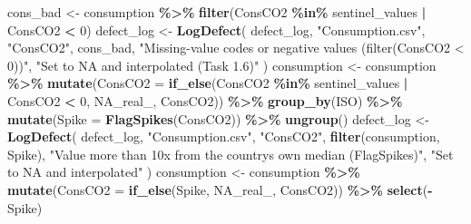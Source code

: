 \documentclass[
]{article}
\newenvironment{Shaded}{\begin{snugshade}}{\end{snugshade}}
\newcommand{\AttributeTok}[1]{\textcolor[rgb]{0.13,0.29,0.53}{#1}}
\newcommand{\ConstantTok}[1]{\textcolor[rgb]{0.56,0.35,0.01}{#1}}
\newcommand{\DecValTok}[1]{\textcolor[rgb]{0.00,0.00,0.81}{#1}}
\newcommand{\FunctionTok}[1]{\textcolor[rgb]{0.13,0.29,0.53}{\textbf{#1}}}
\newcommand{\NormalTok}[1]{#1}
\newcommand{\OtherTok}[1]{\textcolor[rgb]{0.56,0.35,0.01}{#1}}
\newcommand{\SpecialCharTok}[1]{\textcolor[rgb]{0.81,0.36,0.00}{\textbf{#1}}}
\newcommand{\StringTok}[1]{\textcolor[rgb]{0.31,0.60,0.02}{#1}}
\begin{document}
\begin{Shaded}
\begin{Highlighting}[]
\NormalTok{cons\_bad }\OtherTok{\textless{}{-}}\NormalTok{ consumption }\SpecialCharTok{\%\textgreater{}\%}
  \FunctionTok{filter}\NormalTok{(ConsCO2 }\SpecialCharTok{\%in\%}\NormalTok{ sentinel\_values }\SpecialCharTok{|}\NormalTok{ ConsCO2 }\SpecialCharTok{\textless{}} \DecValTok{0}\NormalTok{)}
\NormalTok{defect\_log }\OtherTok{\textless{}{-}} \FunctionTok{LogDefect}\NormalTok{(}
\NormalTok{  defect\_log, }\StringTok{"Consumption.csv"}\NormalTok{, }\StringTok{"ConsCO2"}\NormalTok{, cons\_bad,}
  \StringTok{"Missing{-}value codes or negative values (filter(ConsCO2 \textless{} 0))"}\NormalTok{,}
  \StringTok{"Set to NA and interpolated (Task 1.6)"}
\NormalTok{)}
\NormalTok{consumption }\OtherTok{\textless{}{-}}\NormalTok{ consumption }\SpecialCharTok{\%\textgreater{}\%}
  \FunctionTok{mutate}\NormalTok{(}\AttributeTok{ConsCO2 =} \FunctionTok{if\_else}\NormalTok{(ConsCO2 }\SpecialCharTok{\%in\%}\NormalTok{ sentinel\_values }\SpecialCharTok{|}\NormalTok{ ConsCO2 }\SpecialCharTok{\textless{}} \DecValTok{0}\NormalTok{,}
                           \ConstantTok{NA\_real\_}\NormalTok{, ConsCO2)) }\SpecialCharTok{\%\textgreater{}\%}
  \FunctionTok{group\_by}\NormalTok{(ISO) }\SpecialCharTok{\%\textgreater{}\%}
  \FunctionTok{mutate}\NormalTok{(}\AttributeTok{Spike =} \FunctionTok{FlagSpikes}\NormalTok{(ConsCO2)) }\SpecialCharTok{\%\textgreater{}\%}
  \FunctionTok{ungroup}\NormalTok{()}
\NormalTok{defect\_log }\OtherTok{\textless{}{-}} \FunctionTok{LogDefect}\NormalTok{(}
\NormalTok{  defect\_log, }\StringTok{"Consumption.csv"}\NormalTok{, }\StringTok{"ConsCO2"}\NormalTok{, }\FunctionTok{filter}\NormalTok{(consumption, Spike),}
  \StringTok{"Value more than 10x from the country\textquotesingle{}s own median (FlagSpikes)"}\NormalTok{,}
  \StringTok{"Set to NA and interpolated"}
\NormalTok{)}
\NormalTok{consumption }\OtherTok{\textless{}{-}}\NormalTok{ consumption }\SpecialCharTok{\%\textgreater{}\%}
  \FunctionTok{mutate}\NormalTok{(}\AttributeTok{ConsCO2 =} \FunctionTok{if\_else}\NormalTok{(Spike, }\ConstantTok{NA\_real\_}\NormalTok{, ConsCO2)) }\SpecialCharTok{\%\textgreater{}\%}
  \FunctionTok{select}\NormalTok{(}\SpecialCharTok{{-}}\NormalTok{Spike)}


\end{Highlighting}
\end{Shaded}
\end{document}

